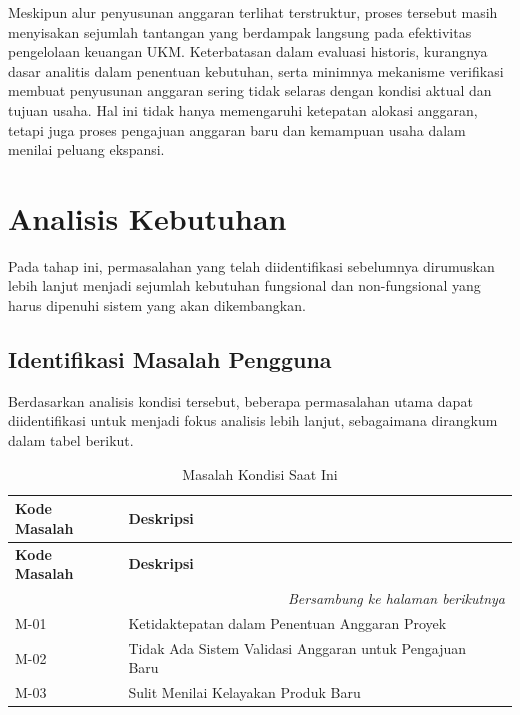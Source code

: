 Meskipun alur penyusunan anggaran terlihat terstruktur, proses tersebut masih menyisakan sejumlah tantangan yang berdampak langsung pada efektivitas pengelolaan keuangan UKM. Keterbatasan dalam evaluasi historis, kurangnya dasar analitis dalam penentuan kebutuhan, serta minimnya mekanisme verifikasi membuat penyusunan anggaran sering tidak selaras dengan kondisi aktual dan tujuan usaha. Hal ini tidak hanya memengaruhi ketepatan alokasi anggaran, tetapi juga proses pengajuan anggaran baru dan kemampuan usaha dalam menilai peluang ekspansi. 

\section{Analisis Kebutuhan}

Pada tahap ini, permasalahan yang telah diidentifikasi
sebelumnya dirumuskan lebih lanjut menjadi sejumlah kebutuhan fungsional dan
non-fungsional yang harus dipenuhi sistem yang akan dikembangkan.

\subsection{Identifikasi Masalah Pengguna}
Berdasarkan analisis kondisi tersebut, beberapa permasalahan utama dapat diidentifikasi untuk menjadi fokus analisis lebih lanjut, sebagaimana dirangkum dalam tabel berikut.

\begin{longtable}{|p{3cm}|p{5cm}|p{5cm}|}
\caption{Masalah Kondisi Saat Ini}
\label{tbl:Masalah} \\
\hline
\textbf{Kode Masalah} &  \textbf{Deskripsi} \\
\hline
\endfirsthead

\hline
\textbf{Kode Masalah} &  \textbf{Deskripsi} \\
\hline
\endhead

\hline
\multicolumn{3}{r}{\textit{Bersambung ke halaman berikutnya}} \\
\endfoot

\hline
\endlastfoot

M-01
&
Ketidaktepatan dalam Penentuan Anggaran Proyek
\\ \hline

M-02
&
Tidak Ada Sistem Validasi Anggaran untuk Pengajuan Baru
\\ \hline

M-03
&
Sulit Menilai Kelayakan Produk Baru
\\ \hline

\end{longtable}

